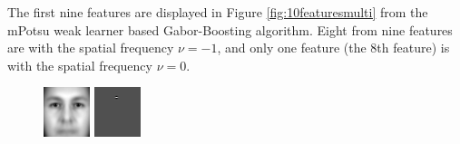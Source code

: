 The first nine features are displayed in \mbox{Figure} \ref{fig:10featuresmulti} from the mPotsu weak learner based Gabor-Boosting algorithm. Eight from nine  features are with the spatial frequency $\nu=-1$, and only one feature (the 8th feature) is with the spatial frequency $\nu=0$.
\begin{figure}[ht]
 \begin{center}
  \includegraphics[width=\columnwidth/11]{ch5/figures/meanface.jpg}
  \includegraphics[width=\columnwidth/11]{ch5/figures/1_Scaling_M.png}

\end{center}
\end{figure}
